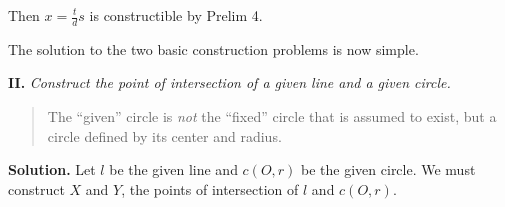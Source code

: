 Then $x=\frac{t}{d}s$ is constructible by Prelim 4. 

\newpage

The solution to the two basic construction problems is now simple. 

\textbf{II.} \textit{Construct the point of intersection of a given line and a given circle.}
\begin{quote}
\vspace*{-10pt}
The ``given'' circle is \emph{not} the ``fixed'' circle that is assumed to exist, but a circle defined by its center and radius.
\vspace*{-10pt}
\end{quote}

\textbf{Solution.} Let $l$ be the given line and $c(O,r)$ be the given circle. We must construct $X$ and $Y$, the points of intersection of $l$ and $c(O,r)$. 

